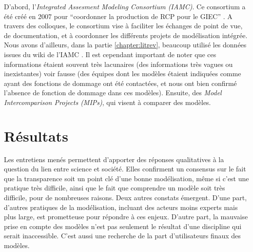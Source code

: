 D'abord, l'\emph{Integrated Assesment Modeling Consortium (IAMC)}. Ce consortium a été créé en 2007 pour \enquote{coordonner la production de RCP pour le GIEC} \autocite{cointe_organising_2019}. A travers des colloques, le consortium vise à faciliter les échanges de point de vue, de documentation, et à coordonner les différents projets de modélisation intégrée. Nous avons d'ailleurs, dans la partie \ref{chapter:litrev}, beaucoup utilisé les données issues du wiki de l'IAMC \autocite{noauthor_models_nodate}. Il est cependant important de noter que ces informations étaient souvent très lacunaires (des informations très vagues ou inexistantes) voir fausse (des équipes dont les modèles étaient indiquées comme ayant des fonctions de dommage ont été contactées, et nous ont bien confirmé l'absence de fonction de dommage dans ces modèles). Ensuite, des \emph{Model Intercomparison Projects (MIPs)}, qui visent à comparer des modèles.  \\







  






\section{Résultats}

Les entretiens menés permettent d'apporter des réponses qualitatives à la question du lien entre science et société. Elles confirment un consensus sur le fait que la transparence soit un point clé d'une bonne modélisation, même si c'est une pratique très difficile, ainsi que le fait que comprendre un modèle soit très difficile, pour de nombreuses raisons. Deux autres constats émergent. D'une part, d'autres pratiques de la modélisation, incluant des acteurs moins experts mais plus large, est prometteuse pour répondre à ces enjeux. D'autre part, la mauvaise prise en compte des modèles n'est pas seulement le résultat d'une discipline qui serait inaccessible. C'est aussi une recherche de la part d'utilisateurs finaux des modèles. 


